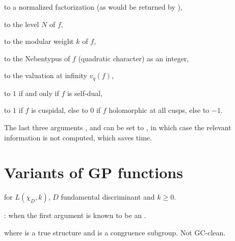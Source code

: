 \item {} to a normalized factorization (as would be returned by
),

\item {} to the level $N$ of $f$,

\item {} to the modular weight $k$ of $f$,

\item {} to the Nebentypus of $f$ (quadratic character)
as an integer,

\item {} to the valuation at infinity $v_q(f)$,

\item {} to $1$ if and only if $f$ is self-dual,

\item {} to $1$ if $f$ is cuspidal, else to $0$ if $f$ holomorphic
at all cusps, else to $-1$.

The last three arguments ,  and  can be set to
, in which case the relevant information is not computed, which
saves time.

\section{Variants of GP functions}





 for $L(\chi_D, k)$, $D$ fundamental
discriminant and $k \geq 0$.

:
  when the first argument is known to be an .



 where
 is a true  structure and  is a congruence subgroup. Not GC-clean.

